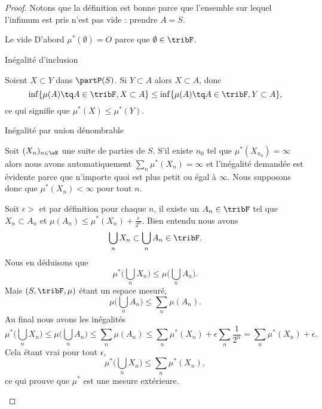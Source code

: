 \begin{proof}
    Notons que la définition est bonne parce que l'ensemble sur lequel l'infimum est pris n'est pas vide : prendre \( A=S\).
    \begin{subproof}
    \item[Le vide]
        D'abord \( \mu^*(\emptyset)=O\) parce que \( \emptyset\in\tribF\).
    \item[Inégalité d'inclusion]

        Soient \( X\subset Y\) dans \( \partP(S)\). Si \( Y\subset A\) alors \( X\subset A\), donc
        \begin{equation}
            \inf \{ \mu(A)\tq A\in\tribF,X\subset A \}\leq \inf \{ \mu(A)\tq A\in\tribF,Y\subset A \},
        \end{equation}
        ce qui signifie que \( \mu^*(X)\leq \mu^*(Y)\).
    \item[Inégalité par union dénombrable]

        Soit \( (X_n)_{n\in \eN}\) une suite de parties de \( S\). S'il existe \( n_0\) tel que \( \mu^*(X_{n_0})=\infty\) alors nous avons automatiquement \( \sum_n\mu^*(X_n)=\infty\) et l'inégalité demandée est évidente parce que n'importe quoi est plus petit ou égal à \( \infty\). Nous supposons donc que \( \mu^*(X_n)<\infty\) pour tout \( n\).

        Soit \( \epsilon>\) et par définition pour chaque \( n\), il existe un \( A_n\in \tribF\) tel que \( X_n\subset A_n\) et \( \mu(A_n)\leq \mu^*(X_n)+\frac{ \epsilon }{ 2^n }\). Bien entendu nous avons
        \begin{equation}
            \bigcup_nX_n\subset \bigcup_nA_n\in\tribF.
        \end{equation}
        Nous en déduisons que
        \begin{equation}
            \mu^*\big( \bigcup_nX_n \big)\leq\mu\big( \bigcup_nA_n \big).
        \end{equation}
        Mais \( (S,\tribF,\mu)\) étant un espace mesuré,
        \begin{equation}
            \mu\big( \bigcup_nA_n \big)\leq \sum_n\mu(A_n).
        \end{equation}
        Au final nous avons les inégalités
        \begin{equation}
            \mu^*\big( \bigcup_nX_n \big)\leq \mu\big( \bigcup_nA_n \big)\leq\sum_n\mu(A_n)\leq \sum_n\mu^*(X_n)+\epsilon\sum_n\frac{1}{ 2^n }=\sum_n\mu^*(X_n)+\epsilon.
        \end{equation}
        Cela étant vrai pour tout \( \epsilon\),
        \begin{equation}
            \mu^*\big( \bigcup_nX_n \big)\leq\sum_n\mu^*(X_n),
        \end{equation}
        ce qui prouve que \( \mu^*\) est une mesure extérieure.


\end{subproof}
\end{proof}
